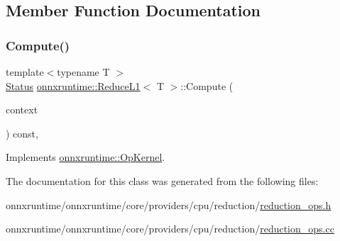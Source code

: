 \subsection{Member Function Documentation}
\mbox{\label{classonnxruntime_1_1ReduceL1_a557360e347a1a330d5daeeb84b0e8a6e}} 
\subsubsection{\texorpdfstring{Compute()}{Compute()}}
{\footnotesize\ttfamily template$<$typename T $>$ \\
\mbox{\hyperlink{classonnxruntime_1_1common_1_1Status}{Status}} \mbox{\hyperlink{classonnxruntime_1_1ReduceL1}{onnxruntime\+::\+Reduce\+L1}}$<$ T $>$\+::Compute (\begin{DoxyParamCaption}\item[{\mbox{\hyperlink{classonnxruntime_1_1OpKernelContext}{Op\+Kernel\+Context}} $\ast$}]{context }\end{DoxyParamCaption}) const\hspace{0.3cm}{\ttfamily [override]}, {\ttfamily [virtual]}}



Implements \mbox{\hyperlink{classonnxruntime_1_1OpKernel_a9eca8656a78b1b3ab9d3351a12798650}{onnxruntime\+::\+Op\+Kernel}}.



The documentation for this class was generated from the following files\+:\begin{DoxyCompactItemize}
\item 
onnxruntime/onnxruntime/core/providers/cpu/reduction/\mbox{\hyperlink{cpu_2reduction_2reduction__ops_8h}{reduction\+\_\+ops.\+h}}\item 
onnxruntime/onnxruntime/core/providers/cpu/reduction/\mbox{\hyperlink{cpu_2reduction_2reduction__ops_8cc}{reduction\+\_\+ops.\+cc}}\end{DoxyCompactItemize}
